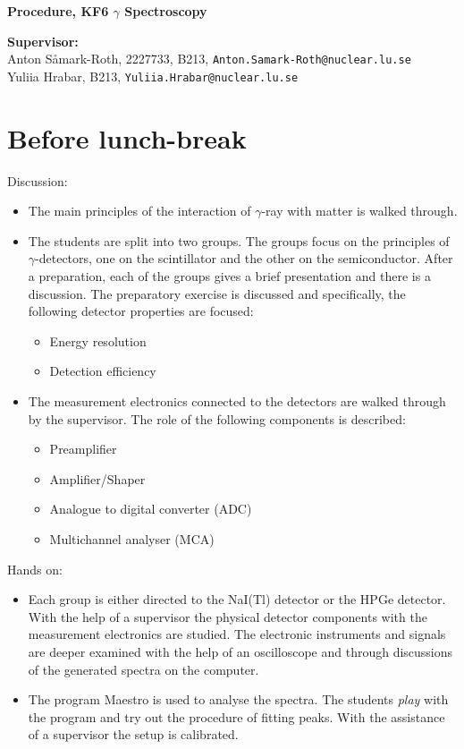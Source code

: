 \documentclass[12pt]{article}
\begin{document}
\begin{center} {\Large\bf\boldmath Procedure, KF6 $\gamma$ Spectroscopy}\\
\end{center}

{\bf Supervisor:}\\
Anton S\r{a}mark-Roth,     2227733, B213, \texttt{Anton.Samark-Roth@nuclear.lu.se}\\
Yuliia Hrabar, B213, \texttt{Yuliia.Hrabar@nuclear.lu.se}\\

\section*{Before lunch-break}
Discussion:
\begin{itemize}
  \item The main principles of the interaction of $\gamma$-ray with matter is walked through.
  \item The students are split into two groups. The groups focus on the principles of $\gamma$-detectors, one on the scintillator and the other on the semiconductor. After a preparation, each of the groups gives a brief presentation and there is a discussion. The preparatory exercise is discussed and specifically, the following detector properties are focused:
    \begin{itemize}
      \item Energy resolution
      \item Detection efficiency
    \end{itemize}
  \item The measurement electronics connected to the detectors are walked through by the supervisor. The role of the following components is described:
  \begin{itemize}
    \item Preamplifier
    \item Amplifier/Shaper
    \item Analogue to digital converter (ADC)
    \item Multichannel analyser (MCA)
  \end{itemize}
\end{itemize}

Hands on:
\begin{itemize}
  \item Each group is either directed to the NaI(Tl) detector or the HPGe detector. With the help of a supervisor the physical detector components with the measurement electronics are studied. The electronic instruments and signals are deeper examined with the help of an oscilloscope and through discussions of the generated spectra on the computer.
  \item The program Maestro is used to analyse the spectra. The students \textit{play} with the program and try out the procedure of fitting peaks. With the assistance of a supervisor the setup is calibrated.
\end{itemize}
\end{document}
